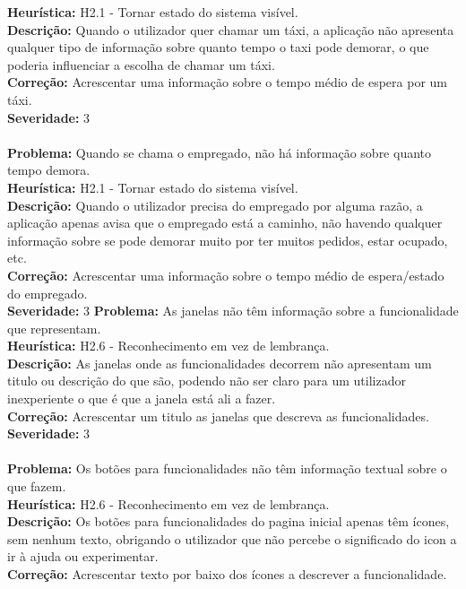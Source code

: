 \documentclass{article}
\begin{document}
\textbf{Heurística:} H2.1 - Tornar estado do sistema visível.\\
\textbf{Descrição:} Quando o utilizador quer chamar um táxi, a aplicação não apresenta qualquer tipo de informação sobre quanto tempo o taxi pode demorar, o que poderia influenciar a escolha de chamar um táxi.\\
\textbf{Correção:} Acrescentar uma informação sobre o tempo médio de espera por um táxi.\\
\textbf{Severidade:} 3\\
\\
\textbf{Problema:} Quando se chama o empregado, não há informação sobre quanto tempo demora.\\
\textbf{Heurística:} H2.1 - Tornar estado do sistema visível.\\
\textbf{Descrição:} Quando o utilizador precisa do empregado por alguma razão, a aplicação apenas avisa que o empregado está a caminho, não havendo qualquer informação sobre se pode demorar muito por ter muitos pedidos, estar ocupado, etc.\\
\textbf{Correção:} Acrescentar uma informação sobre o tempo médio de espera/estado do empregado.\\
\textbf{Severidade:} 3
\clearpage
\noindent\textbf{Problema:} As janelas não têm informação sobre a funcionalidade que representam.\\
\textbf{Heurística:} H2.6 - Reconhecimento em vez de lembrança.\\
\textbf{Descrição:} As janelas onde as funcionalidades decorrem não apresentam um titulo ou descrição do que são, podendo não ser claro para um utilizador inexperiente o que é que a janela está ali a fazer.\\
\textbf{Correção:} Acrescentar um titulo as janelas que descreva as funcionalidades.\\
\textbf{Severidade:} 3\\
\\
\textbf{Problema:} Os botões para funcionalidades não têm informação textual sobre o que fazem.\\
\textbf{Heurística:} H2.6 - Reconhecimento em vez de lembrança.\\
\textbf{Descrição:} Os botões para funcionalidades do pagina inicial apenas têm ícones, sem nenhum texto, obrigando o utilizador que não percebe o significado do icon a ir à ajuda ou experimentar.\\
\textbf{Correção:} Acrescentar texto por baixo dos ícones a descrever a funcionalidade.\\
\end{document}
